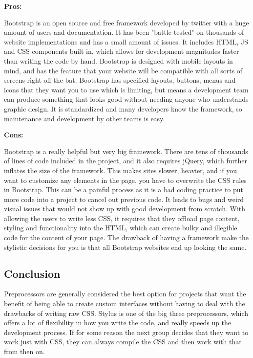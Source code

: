 \documentclass[draftclsnofoot,onecolumn,letterpaper,10pt,compsoc]{IEEEtran}
\begin{document}
    \textbf{Pros:}

    Bootstrap is an open source and free framework developed by twitter with a huge amount of users and documentation.
    It has been "battle tested" on thousands of website implementations and has a small amount of issues.
    It includes HTML, JS and CSS components built in, which allows for development magnitudes faster than writing the code by hand.
    Bootstrap is designed with mobile layouts in mind, and has the feature that your website will be compatible with all sorts of screens right off the bat.
    Bootstrap has specified layouts, buttons, menus and icons that they want you to use which is limiting, but means a development team can produce something that looks good without needing anyone who understands graphic design.
    It is standardized and many developers know the framework, so maintenance and development by other teams is easy.

    \textbf{Cons:}

    Bootstrap is a really helpful but very big framework.
    There are tens of thousands of lines of code included in the project, and it also requires jQuery, which further inflates the size of the framework.
    This makes sites slower, heavier, and if you want to customize any elements in the page, you have to overwrite the CSS rules in Bootstrap.
    This can be a painful process as it is a bad coding practice to put more code into a project to cancel out previous code.
    It leads to bugs and weird visual issues that would not show up with good development from scratch.
    With allowing the users to write less CSS, it requires that they offload page content, styling and functionality into the HTML, which can create bulky and illegible code for the content of your page.
    The drawback of having a framework make the stylistic decisions for you is that all Bootstrap websites end up looking the same.

  \subsection{Conclusion}

  Preprocessors are generally considered the best option for projects that want the benefit of being able to create custom interfaces without having to deal with the drawbacks of writing raw CSS.
  Stylus is one of the big three preprocessors, which offers a lot of flexibility in how you write the code, and really speeds up the development process.
  If for some reason the next group decides that they want to work just with CSS, they can always compile the CSS and then work with that from then on.
\end{document}
